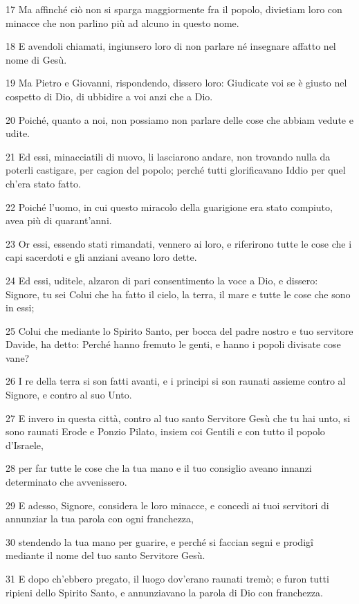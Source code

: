 \par 17 Ma affinché ciò non si sparga maggiormente fra il popolo, divietiam loro con minacce che non parlino più ad alcuno in questo nome.
\par 18 E avendoli chiamati, ingiunsero loro di non parlare né insegnare affatto nel nome di Gesù.
\par 19 Ma Pietro e Giovanni, rispondendo, dissero loro: Giudicate voi se è giusto nel cospetto di Dio, di ubbidire a voi anzi che a Dio.
\par 20 Poiché, quanto a noi, non possiamo non parlare delle cose che abbiam vedute e udite.
\par 21 Ed essi, minacciatili di nuovo, li lasciarono andare, non trovando nulla da poterli castigare, per cagion del popolo; perché tutti glorificavano Iddio per quel ch'era stato fatto.
\par 22 Poiché l'uomo, in cui questo miracolo della guarigione era stato compiuto, avea più di quarant'anni.
\par 23 Or essi, essendo stati rimandati, vennero ai loro, e riferirono tutte le cose che i capi sacerdoti e gli anziani aveano loro dette.
\par 24 Ed essi, uditele, alzaron di pari consentimento la voce a Dio, e dissero: Signore, tu sei Colui che ha fatto il cielo, la terra, il mare e tutte le cose che sono in essi;
\par 25 Colui che mediante lo Spirito Santo, per bocca del padre nostro e tuo servitore Davide, ha detto: Perché hanno fremuto le genti, e hanno i popoli divisate cose vane?
\par 26 I re della terra si son fatti avanti, e i principi si son raunati assieme contro al Signore, e contro al suo Unto.
\par 27 E invero in questa città, contro al tuo santo Servitore Gesù che tu hai unto, si sono raunati Erode e Ponzio Pilato, insiem coi Gentili e con tutto il popolo d'Israele,
\par 28 per far tutte le cose che la tua mano e il tuo consiglio aveano innanzi determinato che avvenissero.
\par 29 E adesso, Signore, considera le loro minacce, e concedi ai tuoi servitori di annunziar la tua parola con ogni franchezza,
\par 30 stendendo la tua mano per guarire, e perché si faccian segni e prodigî mediante il nome del tuo santo Servitore Gesù.
\par 31 E dopo ch'ebbero pregato, il luogo dov'erano raunati tremò; e furon tutti ripieni dello Spirito Santo, e annunziavano la parola di Dio con franchezza.
